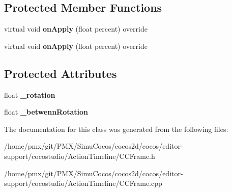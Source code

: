 \subsection*{Protected Member Functions}
\begin{DoxyCompactItemize}
\item 
\mbox{\label{classRotationFrame_a2047a05be05adc291ca138eab234f8d5}} 
virtual void {\bfseries on\+Apply} (float percent) override
\item 
\mbox{\label{classRotationFrame_aa62a5968d02fe4d0448032d46c111d6a}} 
virtual void {\bfseries on\+Apply} (float percent) override
\end{DoxyCompactItemize}
\subsection*{Protected Attributes}
\begin{DoxyCompactItemize}
\item 
\mbox{\label{classRotationFrame_a51bbf5062a67108701b3a3369669268f}} 
float {\bfseries \+\_\+rotation}
\item 
\mbox{\label{classRotationFrame_a9d736bc6f51852bc205b89e0f875f294}} 
float {\bfseries \+\_\+betwenn\+Rotation}
\end{DoxyCompactItemize}


The documentation for this class was generated from the following files\+:\begin{DoxyCompactItemize}
\item 
/home/pmx/git/\+P\+M\+X/\+Simu\+Cocos/cocos2d/cocos/editor-\/support/cocostudio/\+Action\+Timeline/C\+C\+Frame.\+h\item 
/home/pmx/git/\+P\+M\+X/\+Simu\+Cocos/cocos2d/cocos/editor-\/support/cocostudio/\+Action\+Timeline/C\+C\+Frame.\+cpp\end{DoxyCompactItemize}
